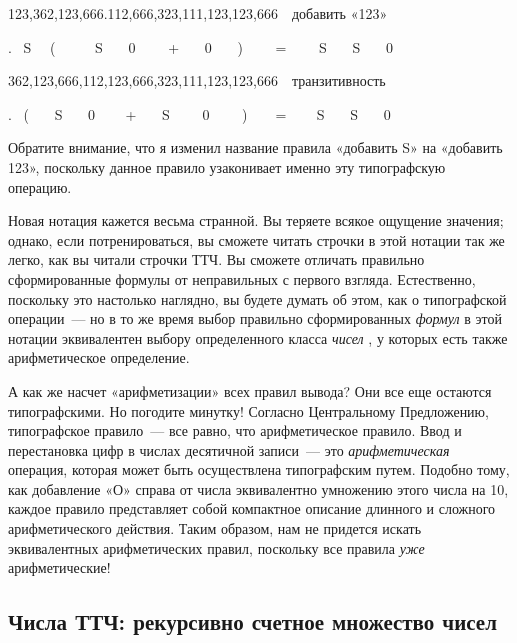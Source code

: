 \documentclass[../main.tex]{subfiles}
\begin{document}
123,362,123,666.112,666,323,111,123,123,666~~добавить «123»

. ~S~~ (~~~~~ S~~~ 0~~~~ +~~ ~0~~~ )~~~~ =~~~~ S~~~ S~~~ 0

362,123,666,112,123,666,323,111,123,123,666~~транзитивность

.~ (~~~ S~~~ 0 ~~~ +~~~ S~~~~ 0~~~~ )~~~~= ~~~ S~~ ~S~~~ 0

Обратите внимание, что я изменил название правила «добавить S» на «добавить 123», поскольку данное правило узаконивает именно эту типографскую операцию.

Новая нотация кажется весьма странной. Вы теряете всякое ощущение значения; однако, если потренироваться, вы сможете читать строчки в этой нотации так же легко, как вы читали строчки ТТЧ. Вы сможете отличать правильно сформированные формулы от неправильных с первого взгляда. Естественно, поскольку это настолько наглядно, вы будете думать об этом, как о типографской операции~--- но в то же время выбор правильно сформированных \emph{формул} в этой нотации эквивалентен выбору определенного класса \emph{чисел} , у которых есть также арифметическое определение.

А как же насчет «арифметизации» всех правил вывода? Они все еще остаются типографскими. Но погодите минутку! Согласно Центральному Предложению, типографское правило~--- все равно, что арифметическое правило. Ввод и перестановка цифр в числах десятичной записи~--- это \emph{арифметическая} операция, которая может быть осуществлена типографским путем. Подобно тому, как добавление «О» справа от числа эквивалентно умножению этого числа на 10, каждое правило представляет собой компактное описание длинного и сложного арифметического действия. Таким образом, нам не придется искать эквивалентных арифметических правил, поскольку все правила \emph{уже} арифметические!


\subsection{Числа ТТЧ: рекурсивно счетное множество чисел}
\end{document}
